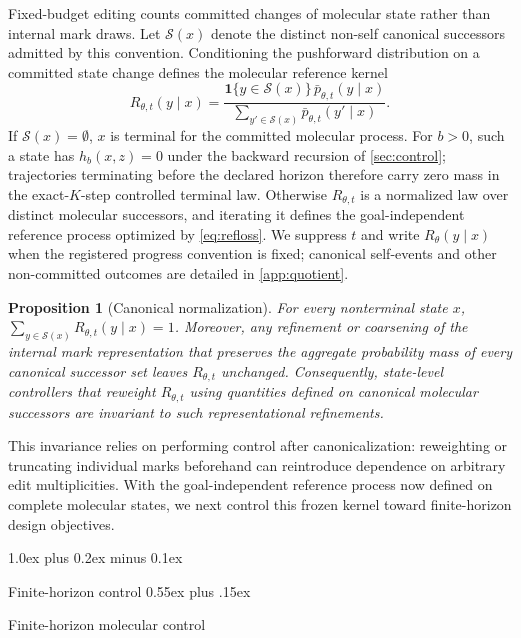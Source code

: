 \documentclass{article}
\makeatletter
\newtheorem{proposition}[theorem]{Proposition}
\theoremstyle{definition}
\theoremstyle{remark}
\def\section{\@startsection{section}{1}{\z@}{-1.4ex plus -0.4ex minus -.2ex}%
  {1.0ex plus 0.2ex minus 0.1ex}{\large\sc\raggedright}}
\def\subsection{\@startsection{subsection}{2}{\z@}{-1.2ex plus -0.4ex minus -.2ex}%
  {0.55ex plus .15ex}{\normalsize\sc\raggedright}}
\newcommand{\Sset}{\mathcal{S}}
\newcommand{\one}{\mathbf{1}}
\makeatother
\begin{document}
Fixed-budget editing counts committed changes of molecular state rather than internal mark draws. Let $\Sset(x)$ denote the distinct non-self canonical successors admitted by this convention. Conditioning the pushforward distribution on a committed state change defines the molecular reference kernel
\begin{equation}
R_{\theta,t}(y\mid x)=\frac{\one\{y\in\Sset(x)\}\,\bar p_{\theta,t}(y\mid x)}{\sum_{y'\in\Sset(x)}\bar p_{\theta,t}(y'\mid x)}.
\label{eq:rtheta}
\end{equation}
If $\Sset(x)=\emptyset$, $x$ is terminal for the committed molecular process. For $b>0$, such a state has $h_b(x,z)=0$ under the backward recursion of \cref{sec:control}; trajectories terminating before the declared horizon therefore carry zero mass in the exact-$K$-step controlled terminal law. Otherwise $R_{\theta,t}$ is a normalized law over distinct molecular successors, and iterating it defines the goal-independent reference process optimized by \cref{eq:refloss}. We suppress $t$ and write $R_\theta(y\mid x)$ when the registered progress convention is fixed; canonical self-events and other non-committed outcomes are detailed in \cref{app:quotient}.

\begin{proposition}[Canonical normalization]
\label{prop:canonical}
For every nonterminal state $x$, $\sum_{y\in\Sset(x)}R_{\theta,t}(y\mid x)=1$. Moreover, any refinement or coarsening of the internal mark representation that preserves the aggregate probability mass of every canonical successor set leaves $R_{\theta,t}$ unchanged. Consequently, state-level controllers that reweight $R_{\theta,t}$ using quantities defined on canonical molecular successors are invariant to such representational refinements.
\end{proposition}

This invariance relies on performing control after canonicalization: reweighting or truncating individual marks beforehand can reintroduce dependence on arbitrary edit multiplicities. With the goal-independent reference process now defined on complete molecular states, we next control this frozen kernel toward finite-horizon design objectives.

\section{Finite-horizon control}
\label{app:control}
\subsection{Finite-horizon molecular control}
\label{sec:control}
\label{sec:doob}
\end{document}
